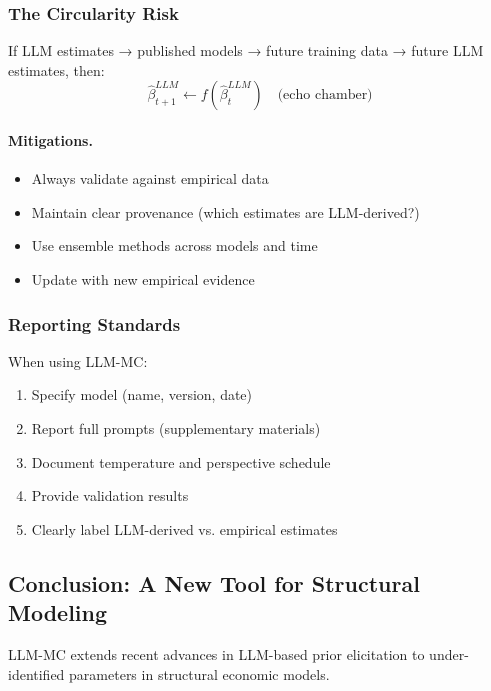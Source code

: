 \subsubsection{The Circularity Risk}

If LLM estimates → published models → future training data → future LLM estimates, then:
\begin{equation}
\hat{\beta}^{LLM}_{t+1} \leftarrow f(\hat{\beta}^{LLM}_t) \quad \text{(echo chamber)}
\end{equation}

\paragraph{Mitigations.}
\begin{itemize}
    \item Always validate against empirical data
    \item Maintain clear provenance (which estimates are LLM-derived?)
    \item Use ensemble methods across models and time
    \item Update with new empirical evidence
\end{itemize}

\subsubsection{Reporting Standards}

When using LLM-MC:
\begin{enumerate}
    \item Specify model (name, version, date)
    \item Report full prompts (supplementary materials)
    \item Document temperature and perspective schedule
    \item Provide validation results
    \item Clearly label LLM-derived vs. empirical estimates
\end{enumerate}

\subsection{Conclusion: A New Tool for Structural Modeling}

LLM-MC extends recent advances in LLM-based prior elicitation \citep{zhu2024eliciting, llmpriors2025scientific, nafar2025extracting} to under-identified parameters in structural economic models.

